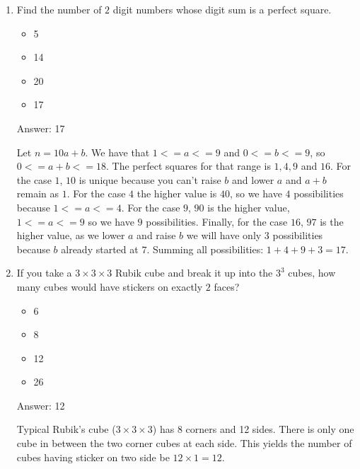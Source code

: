 \documentclass{article}
\begin{document}
\begin{enumerate}
 \[4 \times 9 \times n & = 252 \]
 \[n = 7 \]
 

Thus, Alice has  \(7\) different jackets.

    \item Find the number of $2$ digit numbers whose digit sum is a perfect square.
    
    \begin{itemize}
        \item 5
        \item 14
        \item 20
        \item 17
    \end{itemize}
    
    Answer: 17
    
    Let  \(n=10a+b\). We have that  \(1<=a<=9\) and  \(0<=b<=9\), so  \(0<=a+b<=18\). The perfect squares for that range is  \(1,4,9 \) and  \(16\). For the case  \(1\),  \(10\) is unique because you can't raise  \(b\) and lower  \(a\) and  \(a+b\) remain as  \(1\). For the case  \(4\) the higher value is  \(40\), so we have  \(4\) possibilities because  \(1<=a<=4\). For the case  \(9\),  \(90\) is the higher value,  \(1<=a<=9\) so we have  \(9\) possibilities. Finally, for the case  \(16\),  \(97\) is the higher value, as we lower  \(a\) and raise  \(b\) we will have only  \(3\) possibilities because  \(b\) already started at  \(7\). Summing all possibilities:  \(1+4+9+3=17\).
    
    \item If you take a  \(3 \times 3 \times 3\) Rubik cube and break it up into the  \( 3^3 \) cubes, how many cubes would have stickers on exactly  \(2\) faces?
    
    \begin{itemize}
        \item 6
        \item 8
        \item 12
        \item 26
    \end{itemize}
    
    Answer: 12
    
    Typical Rubik's cube ($3 \times 3 \times 3$) has 8 corners and 12 sides.  There is only one cube in between the two corner cubes at each side. This yields the number of cubes having sticker on two side be  \(12\times1 =\boxed{12}\).
    
\end{enumerate}
\end{document}

